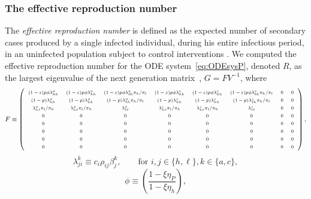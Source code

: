 \documentclass[12pt]{article}
\begin{document}
\subsubsection{The effective reproduction number}

{The \textit{effective reproduction number} is defined as the expected number of secondary cases produced by a single infected individual, during his entire infectious period, in an uninfected population subject to control interventions} \cite{Anderson1991,VanDenDriessche2008}. {We computed the effective reproduction number for the ODE system}~\eqref{eq:ODEsysP}, {denoted $R$, as the largest eigenvalue of the next generation matrix}~\cite{VanDenDriessche2008}, {$G = FV^{-1}$, where}
\begin{equation} \label{eq:matrixF}
{\scriptsize
F \equiv \left(
    { \arraycolsep=6pt\def\arraystretch{1.5}
\begin{array}{cccccccc}
(1-\varepsilon) p \phi  \lambda_{hh}^a &(1-\varepsilon) p \phi  \lambda_{hh}^a &(1-\varepsilon) p \phi  \lambda_{\ell h}^a \pi_h/\pi_l &(1-\varepsilon) p \phi \lambda_{h h}^c &(1-\varepsilon) p \phi  \lambda_{h h}^c &(1-\varepsilon) p \phi  \lambda_{\ell h}^c \pi_h/\pi_l & 0 & 0 \\
 (1-p) \lambda_{hh}^a & (1-p) \lambda_{hh}^a & (1-p) \lambda_{\ell h}^a \pi_h/\pi_l & (1-p) \lambda_{h h}^c & (1-p) \lambda_{h h}^c & (1-p) \lambda_{\ell h}^c \pi_h/\pi_l & 0 & 0 \\
 \lambda_{h \ell}^a \pi_l/\pi_h & \lambda_{h \ell}^a \pi_l/\pi_h & \lambda_{\ell \ell}^a & \lambda_{h \ell}^c\pi_l/\pi_h & \lambda_{h \ell}^c\pi_l/\pi_h & \lambda_{\ell \ell}^c  & 0 & 0 \\
 0 & 0 & 0 & 0 & 0 & 0 & 0 & 0 \\
 0 & 0 & 0 & 0 & 0 & 0 & 0 & 0 \\
 0 & 0 & 0 & 0 & 0 & 0 & 0 & 0 \\
 0 & 0 & 0 & 0 & 0 & 0 & 0 & 0 \\
 0 & 0 & 0 & 0 & 0 & 0 & 0 & 0 \\
\end{array}
}
\right),}
\end{equation}
\begin{equation}
\lambda_{ji}^k \equiv c_i \rho_{ij} \beta_j^k, \qquad \text{for } i,j \in \{h,\ell\}, k \in \{a,c\},
\end{equation}
\begin{equation}
\phi \equiv \left( \frac{1-\xi \eta_P}{1-\xi \eta_h}\right),
\end{equation}
\end{document}

